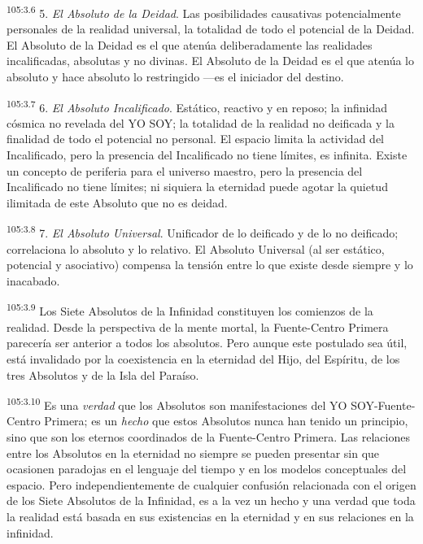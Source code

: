 \par
\textsuperscript{105:3.6} 5. \textit{El Absoluto de la Deidad}. Las posibilidades causativas potencialmente personales de la realidad universal, la totalidad de todo el potencial de la Deidad. El Absoluto de la Deidad es el que atenúa deliberadamente las realidades incalificadas, absolutas y no divinas. El Absoluto de la Deidad es el que atenúa lo absoluto y hace absoluto lo restringido ---es el iniciador del destino.

\par
\textsuperscript{105:3.7} 6. \textit{El Absoluto Incalificado}. Estático, reactivo y en reposo; la infinidad cósmica no revelada del YO SOY; la totalidad de la realidad no deificada y la finalidad de todo el potencial no personal. El espacio limita la actividad del Incalificado, pero la presencia del Incalificado no tiene límites, es infinita. Existe un concepto de periferia para el universo maestro, pero la presencia del Incalificado no tiene límites; ni siquiera la eternidad puede agotar la quietud ilimitada de este Absoluto que no es deidad.

\par
\textsuperscript{105:3.8} 7. \textit{El Absoluto Universal}. Unificador de lo deificado y de lo no deificado; correlaciona lo absoluto y lo relativo. El Absoluto Universal (al ser estático, potencial y asociativo) compensa la tensión entre lo que existe desde siempre y lo inacabado.

\par
\textsuperscript{105:3.9} Los Siete Absolutos de la Infinidad constituyen los comienzos de la realidad. Desde la perspectiva de la mente mortal, la Fuente-Centro Primera parecería ser anterior a todos los absolutos. Pero aunque este postulado sea útil, está invalidado por la coexistencia en la eternidad del Hijo, del Espíritu, de los tres Absolutos y de la Isla del Paraíso.

\par
\textsuperscript{105:3.10} Es una \textit{verdad} que los Absolutos son manifestaciones del YO SOY-Fuente-Centro Primera; es un \textit{hecho} que estos Absolutos nunca han tenido un principio, sino que son los eternos coordinados de la Fuente-Centro Primera. Las relaciones entre los Absolutos en la eternidad no siempre se pueden presentar sin que ocasionen paradojas en el lenguaje del tiempo y en los modelos conceptuales del espacio. Pero independientemente de cualquier confusión relacionada con el origen de los Siete Absolutos de la Infinidad, es a la vez un hecho y una verdad que toda la realidad está basada en sus existencias en la eternidad y en sus relaciones en la infinidad.

